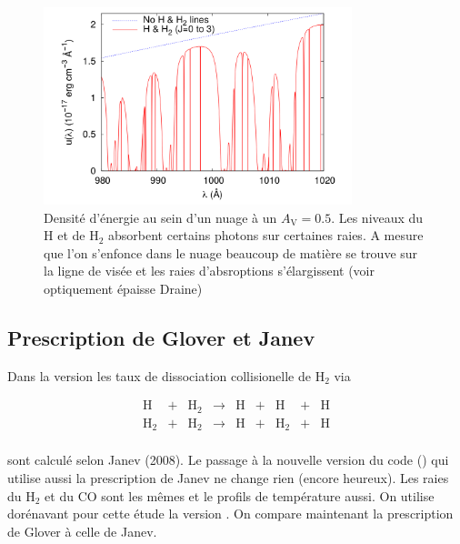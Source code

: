 \begin{figure}[h!]
    \centering
    \includegraphics[width = 0.8\textwidth]{figure/H2/fgk.png}
    \caption{Densité d'énergie au sein d'un nuage à un $A_\mathrm{V}=0.5$. Les niveaux du $\mathrm{H}$ et de $\mathrm{H}_2$ absorbent certains photons sur certaines raies. A mesure que l'on s'enfonce dans le nuage beaucoup de matière se trouve sur la ligne de visée et les raies d'absroptions s'élargissent (voir optiquement épaisse Draine) \cite{FGK}}
    \label{fig:H2:fgk}
\end{figure}


\subsection{Prescription de Glover et Janev}

Dans la version \uncinq les taux de dissociation collisionelle de $\mathrm{H}_2$ via 

\begin{equation}
    \begin{array}{lcccccccl}
        \mathrm{H} & + & \mathrm{H}_2   & \rightarrow &\mathrm{H}  & + & \mathrm{H} & + & \mathrm{H} \\
        \mathrm{H}_2  & + & \mathrm{H}_2  & \rightarrow & \mathrm{H} & + &\mathrm{H}_2  & + & \mathrm{H} \\
    \end{array}
\end{equation}

sont calculé selon Janev (2008). Le passage à la nouvelle version du code (\unsept) qui utilise aussi la prescription de Janev ne change rien (encore heureux). Les raies du $\mathrm{H}_2$ et du $\mathrm{CO}$ sont les mêmes et le profils de température aussi. On utilise dorénavant pour cette étude la version \unsept. On compare maintenant la prescription de Glover à celle de Janev. \newline

